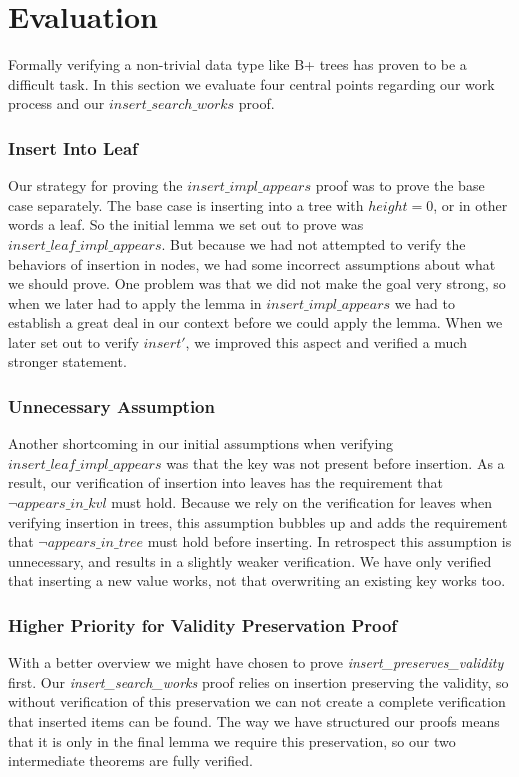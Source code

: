 \section{Evaluation}
\label{sec:Evaluation}
Formally verifying a non-trivial data type like B+ trees has proven to be a difficult task. In this section we evaluate four central points regarding our work process and our $insert\_search\_works$ proof.

\subsubsection{Insert Into Leaf}
Our strategy for proving the $insert\_impl\_appears$ proof was to prove the base case separately. The base case is inserting into a tree with $height = 0$, or in other words a leaf. So the initial lemma we set out to prove was $insert\_leaf\_impl\_appears$. But because we had not attempted to verify the behaviors of insertion in nodes, we had some incorrect assumptions about what we should prove. One problem was that we did not make the goal very strong, so when we later had to apply the lemma in $insert\_impl\_appears$ we had to establish a great deal in our context before we could apply the lemma. When we later set out to verify $insert'$, we improved this aspect and verified a much stronger statement.

\subsubsection{Unnecessary Assumption}
Another shortcoming in our initial assumptions when verifying $insert\_leaf\_impl\_appears$ was that the key was not present before insertion. As a result, our verification of insertion into leaves has the requirement that $\lnot appears\_in\_kvl$ must hold. Because we rely on the verification for leaves when verifying insertion in trees, this assumption bubbles up and adds the requirement that $\lnot appears\_in\_tree$ must hold before inserting. In retrospect this assumption is unnecessary, and results in a slightly weaker verification. We have only verified that inserting a new value works, not that overwriting an existing key works too. 

\subsubsection{Higher Priority for Validity Preservation Proof}

With a better overview we might have chosen to prove \textit{insert\allowbreak{}\_preserves\allowbreak{}\_validity} first. Our \textit{insert\allowbreak{}\_search\allowbreak{}\_works} proof relies on insertion preserving the validity, so without verification of this preservation we can not create a complete verification that inserted items can be found. The way we have structured our proofs means that it is only in the final lemma we require this preservation, so our two intermediate theorems are fully verified.

